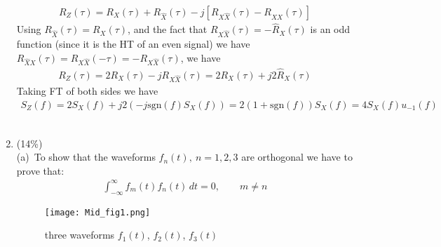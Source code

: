 \documentclass[a4paper,12pt]{article}
\begin{document}
\begin{enumerate}
\begin{align*}
            R_Z(\tau)=R_X(\tau)+R_{\widehat{X}}(\tau)-j\left[ R_{X\widehat{X}}(\tau)-R_{\widehat{X}X}(\tau)\right]
        \end{align*}
        Using $R_{\widehat{X}}(\tau)=R_X(\tau)$, and the fact that $R_{X\widehat{X}}(\tau)=-\widehat{R}_X(\tau)$ is an odd function (since it is the HT of an even signal) we have $R_{\widehat{X}X}(\tau)=R_{X\widehat{X}}(-\tau)=-R_{X\widehat{X}}(\tau)$, we have 
        \begin{align*}
            R_Z(\tau)=2R_X(\tau)-jR_{X\widehat{X}}(\tau)=2R_X(\tau)+j2\widehat{R}_X(\tau)
        \end{align*}
        Taking FT of both sides we have
        \begin{align*}
            S_Z(f)=2S_X(f)+j2(-j\text{sgn}(f)S_X(f))=2(1+\text{sgn}(f))S_X(f)=4S_X(f)u_{-1}(f)
        \end{align*}\\
        \item (14\%) \\
        (a)\ To show that the waveforms $f_n(t),\ n=1, 2, 3$ are orthogonal we have to prove that: \\
        \begin{align*}
            \int_{-\infty}^{\infty} f_m(t)f_n(t)\, dt=0, \qquad m\neq n
        \end{align*}
        \begin{figure}[h]
        	\centering
        	\texttt{[image: Mid\_fig1.png]}
        	\caption{three waveforms $f_1(t)$, $f_2(t)$, $f_3(t)$}
        \end{figure} \\

\end{enumerate}
\end{document}
